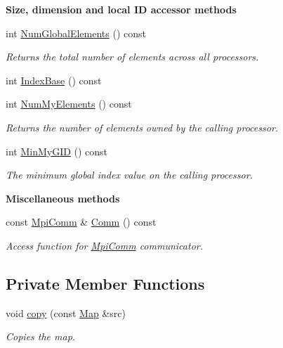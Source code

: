 \begin{Indent}{\bf Size, dimension and local I\-D accessor methods}\par
\begin{DoxyCompactItemize}
\item 
int \hyperlink{class_q_u_e_s_o_1_1_map_ac67907266dcd7108ffe5a0cbef908781}{Num\-Global\-Elements} () const 
\begin{DoxyCompactList}\small\item\em Returns the total number of elements across all processors. \end{DoxyCompactList}\item 
int \hyperlink{class_q_u_e_s_o_1_1_map_a83f67cf2643489a45ef0e515d814c89d}{Index\-Base} () const 
\item 
int \hyperlink{class_q_u_e_s_o_1_1_map_a6407f6d6a6df8a0a40923c8dc524b021}{Num\-My\-Elements} () const 
\begin{DoxyCompactList}\small\item\em Returns the number of elements owned by the calling processor. \end{DoxyCompactList}\item 
int \hyperlink{class_q_u_e_s_o_1_1_map_a686b1ea15e0aa9a5de9d6a03456be4a9}{Min\-My\-G\-I\-D} () const 
\begin{DoxyCompactList}\small\item\em The minimum global index value on the calling processor. \end{DoxyCompactList}\end{DoxyCompactItemize}
\end{Indent}
\begin{Indent}{\bf Miscellaneous methods}\par
\begin{DoxyCompactItemize}
\item 
const \hyperlink{class_q_u_e_s_o_1_1_mpi_comm}{Mpi\-Comm} \& \hyperlink{class_q_u_e_s_o_1_1_map_aab4fc9911156b61c51f905849e3c9856}{Comm} () const 
\begin{DoxyCompactList}\small\item\em Access function for \hyperlink{class_q_u_e_s_o_1_1_mpi_comm}{Mpi\-Comm} communicator. \end{DoxyCompactList}\end{DoxyCompactItemize}
\end{Indent}
\subsection*{Private Member Functions}
\begin{DoxyCompactItemize}
\item 
void \hyperlink{class_q_u_e_s_o_1_1_map_a2ed4b24e922e77695d85de7fd4e9042a}{copy} (const \hyperlink{class_q_u_e_s_o_1_1_map}{Map} \&src)
\begin{DoxyCompactList}\small\item\em Copies the map. \end{DoxyCompactList}\end{DoxyCompactItemize}
